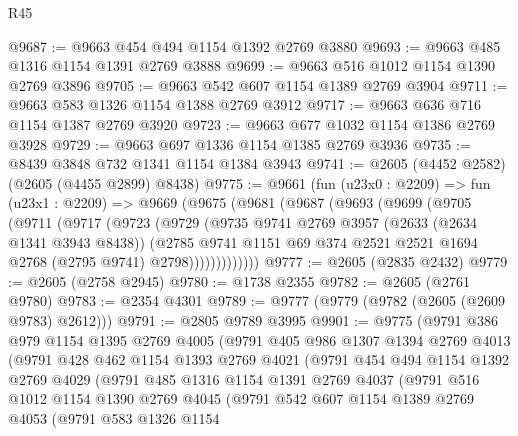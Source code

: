 \begin{lexlean}{R45}
\begin{coremodule}
@9687 := @9663 @454 @494 @1154 @1392 @2769 @3880
@9693 := @9663 @485 @1316 @1154 @1391 @2769 @3888
@9699 := @9663 @516 @1012 @1154 @1390 @2769 @3896
@9705 := @9663 @542 @607 @1154 @1389 @2769 @3904
@9711 := @9663 @583 @1326 @1154 @1388 @2769 @3912
@9717 := @9663 @636 @716 @1154 @1387 @2769 @3920
@9723 := @9663 @677 @1032 @1154 @1386 @2769 @3928
@9729 := @9663 @697 @1336 @1154 @1385 @2769 @3936
@9735 := @8439 @3848 @732 @1341 @1154 @1384 @3943
@9741 := @2605 (@4452 @2582) (@2605 (@4455 @2899) @8438)
@9775 := @9661
    (fun (u23x0 : @2209) =>
    fun (u23x1 : @2209) =>
    @9669
      (@9675
        (@9681
          (@9687
            (@9693
              (@9699
                (@9705
                  (@9711
                    (@9717
                      (@9723
                        (@9729
                          (@9735
                            @9741
                            @2769
                            @3957
                            (@2633 (@2634 @1341 @3943 @8438))
                            (@2785
                              @9741
                              @1151
                              @69
                              @374
                              @2521
                              @2521
                              @1694
                              @2768
                              (@2795 @9741)
                              @2798)))))))))))))
@9777 := @2605 (@2835 @2432)
@9779 := @2605 (@2758 @2945)
@9780 := @1738 @2355
@9782 := @2605 (@2761 @9780)
@9783 := @2354 @4301
@9789 := @9777 (@9779 (@9782 (@2605 (@2609 @9783) @2612)))
@9791 := @2805 @9789 @3995
@9901 := @9775
    (@9791
      @386
      @979
      @1154
      @1395
      @2769
      @4005
      (@9791
        @405
        @986
        @1307
        @1394
        @2769
        @4013
        (@9791
          @428
          @462
          @1154
          @1393
          @2769
          @4021
          (@9791
            @454
            @494
            @1154
            @1392
            @2769
            @4029
            (@9791
              @485
              @1316
              @1154
              @1391
              @2769
              @4037
              (@9791
                @516
                @1012
                @1154
                @1390
                @2769
                @4045
                (@9791
                  @542
                  @607
                  @1154
                  @1389
                  @2769
                  @4053
                  (@9791
                    @583
                    @1326
                    @1154

\end{coremodule}
\end{lexlean}
